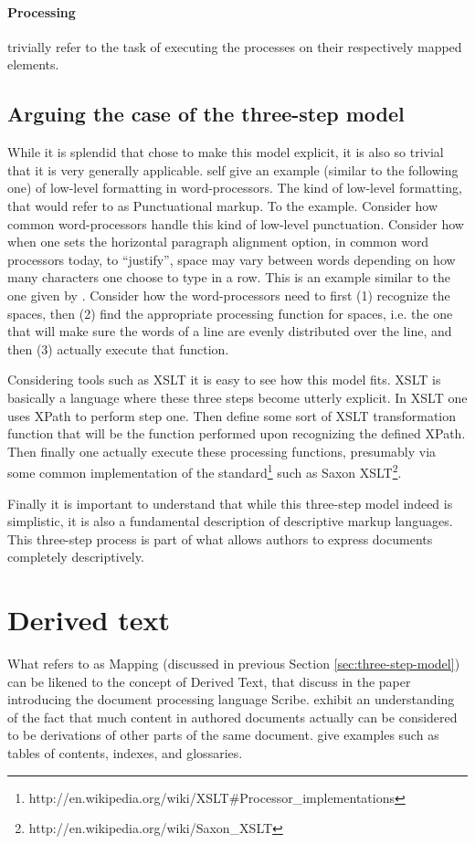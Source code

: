 \documentclass{scrreprt}
\begin{document}
\paragraph{Processing} trivially refer to the task of executing the processes on their respectively mapped elements.


\subsection{Arguing the case of the three-step model}
While it is splendid that \citet{goldfarb} chose to make this model explicit, it is also so trivial that it is very generally applicable. \citet{goldfarb} self give an example (similar to the following one) of low-level formatting in word-processors. The kind of low-level formatting, that \citet{coombs} would refer to as Punctuational markup. To the example. Consider how common word-processors handle this kind of low-level punctuation. Consider how when one sets the horizontal paragraph alignment option, in common word processors today, to ``justify'', space may vary between words depending on how many characters one choose to type in a row. This is an example similar to the one given by \citet{goldfarb}. Consider how the word-processors need to first (1) recognize the spaces, then (2) find the appropriate processing function for spaces, i.e. the one that will make sure the words of a line are evenly distributed over the line, and then (3) actually execute that function.

Considering tools such as XSLT it is easy to see how this model fits. XSLT is basically a language where these three steps become utterly explicit. In XSLT one uses XPath to perform step one. Then define some sort of XSLT transformation function that will be the function performed upon recognizing the defined XPath. Then finally one actually execute these processing functions, presumably via some common implementation of the standard\footnote{http://en.wikipedia.org/wiki/XSLT\#Processor\_implementations} such as Saxon XSLT\footnote{http://en.wikipedia.org/wiki/Saxon\_XSLT}.

Finally it is important to understand that while this three-step model indeed is simplistic, it is also a fundamental description of descriptive markup languages. This three-step process is part of what allows authors to express documents completely descriptively.





\section{Derived text}
\label{sec:theory:derived-text}
What \citet{goldfarb} refers to as Mapping (discussed in previous Section \ref{sec:three-step-model}) can be likened to the concept of Derived Text, that \citet{reid} discuss in the paper introducing the document processing language Scribe. \citet{reid} exhibit an understanding of the fact that much content in authored documents actually can be considered to be derivations of other parts of the same document. \citet{reid} give examples such as tables of contents, indexes, and glossaries.
\end{document}
